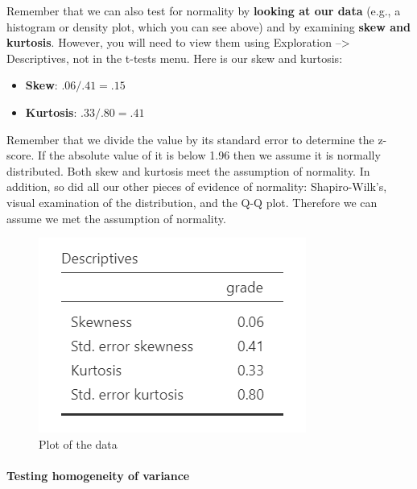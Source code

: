 \documentclass[
]{book}
\begin{document}
Remember that we can also test for normality by \textbf{looking at our data} (e.g., a histogram or density plot, which you can see above) and by examining \textbf{skew and kurtosis}. However, you will need to view them using Exploration --\textgreater{} Descriptives, not in the t-tests menu. Here is our skew and kurtosis:

\begin{itemize}
\item
  \textbf{Skew}: \(.06/.41 = .15\)
\item
  \textbf{Kurtosis}: \(.33/.80 = .41\)
\end{itemize}

Remember that we divide the value by its standard error to determine the z-score. If the absolute value of it is below 1.96 then we assume it is normally distributed. Both skew and kurtosis meet the assumption of normality. In addition, so did all our other pieces of evidence of normality: Shapiro-Wilk's, visual examination of the distribution, and the Q-Q plot. Therefore we can assume we met the assumption of normality.

\begin{figure}

{\centering \includegraphics[width=0.8\linewidth]{images/02-independent_t-test/independent_t-test_skewkurtosis} 

}

\caption{Plot of the data}\label{fig:unnamed-chunk-5}
\end{figure}

\hypertarget{testing-homogeneity-of-variance}{%
\paragraph{Testing homogeneity of variance}\label{testing-homogeneity-of-variance}}
\end{document}
